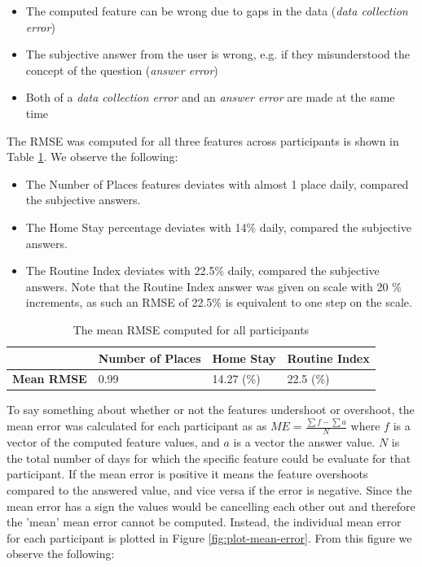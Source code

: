 \begin{itemize}
    \item The computed feature can be wrong due to gaps in the data (\textit{data collection error})
    \item The subjective answer from the user is wrong, e.g. if they misunderstood the concept of the question (\textit{answer error})
    \item Both of a \textit{data collection error} and an \textit{answer error} are made at the same time
\end{itemize}

The RMSE was computed for all three features across participants is shown in Table \ref{tab:error-table}. We observe the following:

\begin{itemize}
    \item The Number of Places features deviates with almost 1 place daily, compared the subjective answers.

    \item The Home Stay percentage deviates with 14\% daily, compared the subjective answers.

    \item The Routine Index deviates with 22.5\% daily, compared the subjective answers. Note that the Routine Index answer was given on scale with 20 \% increments, as such an RMSE of 22.5\% is equivalent to one step on the scale.
\end{itemize}

\begin{table}[]
    \centering
    \begin{tabular}{|l|l|l|l|}
    \hline
                        & \textbf{Number of Places} & \textbf{Home Stay} & \textbf{Routine Index} \\ \hline
    \textbf{Mean RMSE}       & 0.99                      & 14.27 (\%)         & 22.5 (\%)              \\ \hline
    \end{tabular}
    \caption{The mean RMSE computed for all participants}
    \label{tab:error-table}
\end{table}


To say something about whether or not the features undershoot or overshoot, the mean error was calculated for each participant as as $ME = \frac{\sum f - \sum a}{N}$ where $f$ is a vector of the computed feature values, and $a$ is a vector the answer value. $N$ is the total number of days for which the specific feature could be evaluate for that participant. If the mean error is positive it means the feature overshoots compared to the answered value, and vice versa if the error is negative. Since the mean error has a sign the values would be cancelling each other out and therefore the 'mean' mean error cannot be computed. Instead, the individual mean error for each participant is plotted in Figure \ref{fig:plot-mean-error}. From this figure we observe the following:


